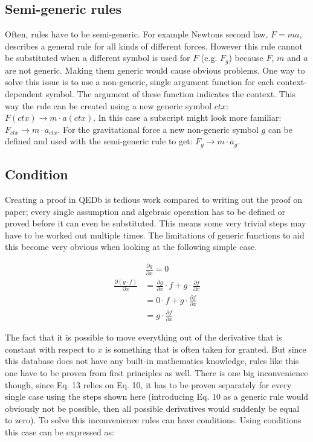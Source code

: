 \documentclass{article}
\begin{document}
\subsection{Semi-generic rules}
Often, rules have to be semi-generic. For example Newtons second law, $F=ma$, describes a general rule for all kinds of different forces. However this rule cannot be substituted when a different symbol is used for $F$ (e.g. $F_g$) because $F$, $m$ and $a$ are not generic. Making them generic would cause obvious problems. One way to solve this issue is to use a non-generic, single argument function for each context-dependent symbol. The argument of these function indicates the context. This way the rule can be created using a new generic symbol $ctx$: $F(ctx)\rightarrow m\cdot a(ctx)$. In this case a subscript might look more familiar: $F_{ctx}\rightarrow m\cdot a_{ctx}$. For the gravitational force a new non-generic symbol $g$ can be defined and used with the semi-generic rule to get: $F_g\rightarrow m\cdot a_g$. 

\subsection{Condition}
Creating a proof in QEDb is tedious work compared to writing out the proof on paper; every single assumption and algebraic operation has to be defined or proved before it can even be substituted. This means some very trivial steps may have to be worked out multiple times. The limitations of generic functions to aid this become very obvious when looking at the following simple case.

\begin{align} \frac{\partial g}{\partial x}=0
\end{align}
\begin{align}
\frac{\partial (g\cdot f)}{\partial x}
&= \frac{\partial g}{\partial x}\cdot f+g\cdot\frac{\partial f}{\partial x}\\
&= 0\cdot f+g\cdot\frac{\partial f}{\partial x}\\
&= g\cdot\frac{\partial f}{\partial x}
\end{align}

\newpage

The fact that it is possible to move everything out of the derivative that is constant with respect to $x$ is something that is often taken for granted. But since this database does not have any built-in mathematics knowledge, rules like this one have to be proven from first principles as well. There is one big inconvenience though, since Eq. 13 relies on Eq. 10, it has to be proven separately for every single case using the steps shown here (introducing Eq. 10 as a generic rule would obviously not be possible, then all possible derivatives would suddenly be equal to zero). To solve this inconvenience rules can have conditions. Using conditions this case can be expressed as:
\end{document}

